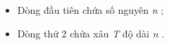 \begin{itemize}
	\item Dòng đầu tiên chứa số nguyên \emph{ n } ;
	\item Dòng thứ 2 chứa xâu \emph{ T } độ dài \emph{ n } .
\end{itemize}

\